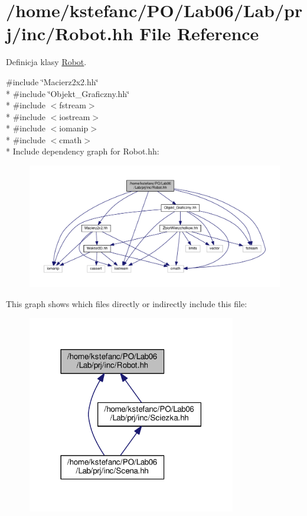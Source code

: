 \hypertarget{_robot_8hh}{\section{/home/kstefanc/\+P\+O/\+Lab06/\+Lab/prj/inc/\+Robot.hh File Reference}
\label{_robot_8hh}
}


Definicja klasy \hyperlink{class_robot}{Robot}.  


{\ttfamily \#include \char`\"{}Macierz2x2.\+hh\char`\"{}}\\*
{\ttfamily \#include \char`\"{}Objekt\+\_\+\+Graficzny.\+hh\char`\"{}}\\*
{\ttfamily \#include $<$fstream$>$}\\*
{\ttfamily \#include $<$iostream$>$}\\*
{\ttfamily \#include $<$iomanip$>$}\\*
{\ttfamily \#include $<$cmath$>$}\\*
Include dependency graph for Robot.\+hh\+:\nopagebreak
\begin{figure}[H]
\begin{center}
\leavevmode
\includegraphics[width=350pt]{_robot_8hh__incl}
\end{center}
\end{figure}
This graph shows which files directly or indirectly include this file\+:\nopagebreak
\begin{figure}[H]
\begin{center}
\leavevmode
\includegraphics[width=258pt]{_robot_8hh__dep__incl}
\end{center}
\end{figure}
